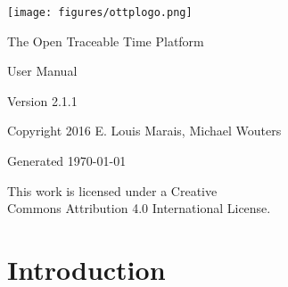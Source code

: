 \documentclass[11pt,a4paper,openany,oneside]{book}
\begin{document}
\begin{titlepage}

\begin{center}
\centerline{\texttt{[image: figures/ottplogo.png]}}
\end{center}

\vspace*{4cm} 

\begin{center}
{\Huge The Open Traceable Time Platform}
\end{center}

\vspace*{4cm} 

\begin{center}
{\Huge User Manual}
\end{center}

\vspace*{4cm}

\begin{center}
Version 2.1.1
\end{center}

\begin{center}
Copyright 2016 E. Louis Marais, Michael Wouters
\end{center}

\begin{center}
Generated \today
\end{center}

\end{titlepage}


\begin{titlepage}

\begin{center}
{\Large This work is licensed under a Creative \\
Commons Attribution 4.0 International License.}
\end{center}

\end{titlepage}

\tableofcontents
\listoffigures
\listoftables

\lstset{
	xleftmargin=24pt,
	basewidth=0.5em,
	basicstyle=\ttfamily,
	escapechar=\%
}

\chapter{Introduction}
\end{document}
